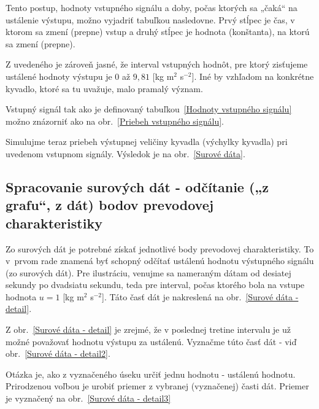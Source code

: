 \documentclass[a4paper, 10pt, ]{article}
\begin{document}










Tento postup, hodnoty vstupného signálu a doby, počas ktorých sa „čaká“ na ustálenie výstupu, možno vyjadriť tabuľkou nasledovne. Prvý stĺpec je čas, v ktorom sa zmení (prepne) vstup a druhý stĺpec je hodnota (konštanta), na ktorú sa zmení (prepne).




Z uvedeného je zároveň jasné, že interval vstupných hodnôt, pre ktorý zisťujeme ustálené hodnoty výstupu je $0$ až $9,81$ [kg m$^2$ s$^{-2}$]. Iné by vzhľadom na konkrétne kyvadlo, ktoré sa tu uvažuje, malo pramalý význam.

Vstupný signál tak ako je definovaný tabuľkou~\ref{Hodnoty vstupného signálu} možno znázorniť ako na obr.~\ref{Priebeh vstupného signálu}.


Simulujme teraz priebeh výstupnej veličiny kyvadla (výchylky kyvadla) pri uvedenom vstupnom signály. Výsledok je na obr.~\ref{Surové dáta}.






\subsection[Spracovanie surových dát]{Spracovanie surových dát - odčítanie („z grafu“, z dát) bodov prevodovej charakteristiky}


Zo surových dát je potrebné získať jednotlivé body prevodovej charakteristiky. To v~prvom rade znamená byť schopný odčítať ustálenú hodnotu výstupného signálu (zo surových dát). Pre ilustráciu, venujme sa nameraným dátam od desiatej sekundy po dvadsiatu sekundu, teda pre interval, počas ktorého bola na vstupe hodnota $u=1$ [kg m$^2$ s$^{-2}$]. Táto časť dát je nakreslená na obr.~\ref{Surové dáta - detail}.



Z obr.~\ref{Surové dáta - detail} je zrejmé, že v poslednej tretine intervalu je už možné považovať hodnotu výstupu za ustálenú. Vyznačme túto časť dát - viď obr.~\ref{Surové dáta - detail2}.






Otázka je, ako z vyznačeného úseku určiť jednu hodnotu - ustálenú hodnotu. Prirodzenou voľbou je urobiť priemer z vybranej (vyznačenej) časti dát. Priemer je vyznačený na obr.~\ref{Surové dáta - detail3}
\end{document}
